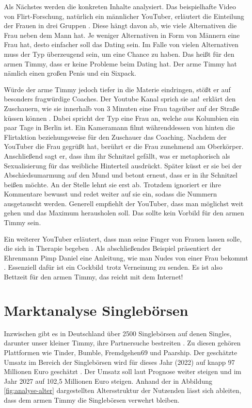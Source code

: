 Als Nächstes werden die konkreten Inhalte analysiert.
Das beispielhafte Video von \glqq Flirt-Forschung\grqq, natürlich ein männlicher YouTuber, erläutert die Einteilung der Frauen in drei Gruppen \cite{royalflushseduction}.
Diese hängt davon ab, wie viele Alternativen die Frau neben dem Mann hat.
Je weniger Alternativen in Form von Männern eine Frau hat, desto einfacher soll das Dating sein.
Im Falle von vielen Alternativen muss der Typ überzeugend sein, um eine Chance zu haben.
Das heißt für den armen Timmy, dass er keine Probleme beim Dating hat.
Der arme Timmy hat nämlich einen großen Penis und ein Sixpack.

Würde der arme Timmy jedoch tiefer in die Materie eindringen, stößt er auf besonders fragwürdige Coaches.
Der Youtube Kanal \glqq sprich sie an!\grqq~erklärt den Zuschauern, wie sie innerhalb von 3 Minuten eine Frau tagsüber auf der Straße küssen können \cite{youtube_2019}.
Dabei spricht der Typ eine Frau an, welche aus Kolumbien ein paar Tage in Berlin ist.
Ein Kameramann filmt währenddessen von hinten die Flirtaktion beziehungsweise für den Zuschauer das Coaching.
Nachdem der YouTuber die Frau gegrüßt hat, berührt er die Frau zunehmend am Oberkörper.
Anschließend sagt er, dass ihm ihr Schnitzel gefällt, was er metaphorisch als Sexualisierung für das weibliche Hinterteil ausdrückt.
Später küsst er sie bei der Abschiedsumarmung auf den Mund und betont erneut, dass er in ihr Schnitzel beißen möchte. 
An der Stelle lehnt sie erst ab.
Trotzdem ignoriert er ihre Kommentare bewusst und redet weiter auf sie ein, sodass die Nummern ausgetauscht werden.
Generell empfiehlt der YouTuber, dass man möglichst weit gehen und das Maximum herausholen soll.
Das sollte kein Vorbild für den armen Timmy sein.

Ein weiterer YouTuber erläutert, dass man seine Finger von Frauen lassen solle, die sich in Therapie begeben \cite{markopua_2019}.
Als abschließendes Beispiel präsentiert der Ehrenmann Pimp Daniel eine Anleitung, wie man Nudes von einer Frau bekommt \cite{cobertv_2020}. 
Essenziell dafür ist ein \glqq Cockbild\grqq~trotz Verneinung zu senden.
Es ist also Bettzeit für den armen Timmy, das reicht mit dem Internet!   


\section{Marktanalyse Singlebörsen}

Inzwischen gibt es in Deutschland über 2500 Singlebörsen auf denen Singles, darunter unser kleiner Timmy, ihre Partnersuche bestreiten \cite{kundler}.
Zu diesen gehören Plattformen wie Tinder, Bumble, Fremdgehen69 und Paarship.
Der geschätzte Umsatz im Bereich der Singlebörsen wird für dieses Jahr (2022) auf knapp 97 Millionen Euro geschätzt \cite{statista}.
Der Umsatz soll laut Prognose weiter steigen und im Jahr 2027 auf 102,5 Millionen Euro steigen.
Anhand der in Abbildung \ref{fig:analyse-alter} dargestellten Altersstruktur der Nutzenden lässt sich ableiten, dass dem armen Timmy die Singlebörsen verwehrt bleiben.

